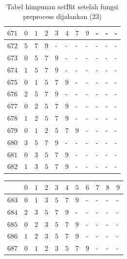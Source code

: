 \begin{appendices}
\begin{table}[H]
\begin{tabular} {|l|l|l|l|l|l|l|l|l|l|l|}
  		$ 671 $ & $ 0 $ &$ 1 $ &$ 2 $ &$ 3 $ &$ 4 $ &$ 7 $ &$ 9 $ & - &  - &  -   \\ \hline
  		$ 672 $ & $ 5 $ &$ 7 $ &$ 9 $ & - &  - &  - &  - &  - &  - &  -   \\ \hline
  		$ 673 $ & $ 0 $ &$ 5 $ &$ 7 $ &$ 9 $ & - &  - &  - &  - &  - &  -   \\ \hline
  		$ 674 $ & $ 1 $ &$ 5 $ &$ 7 $ &$ 9 $ & - &  - &  - &  - &  - &  -   \\ \hline
  		$ 675 $ & $ 0 $ &$ 1 $ &$ 5 $ &$ 7 $ &$ 9 $ & - &  - &  - &  - &  -   \\ \hline
  		$ 676 $ & $ 2 $ &$ 5 $ &$ 7 $ &$ 9 $ & - &  - &  - &  - &  - &  -   \\ \hline
  		$ 677 $ & $ 0 $ &$ 2 $ &$ 5 $ &$ 7 $ &$ 9 $ & - &  - &  - &  - &  -   \\ \hline
  		$ 678 $ & $ 1 $ &$ 2 $ &$ 5 $ &$ 7 $ &$ 9 $ & - &  - &  - &  - &  -   \\ \hline
  		$ 679 $ & $ 0 $ &$ 1 $ &$ 2 $ &$ 5 $ &$ 7 $ &$ 9 $ & - &  - &  - &  -   \\ \hline
  		$ 680 $ & $ 3 $ &$ 5 $ &$ 7 $ &$ 9 $ & - &  - &  - &  - &  - &  -   \\ \hline
  		$ 681 $ & $ 0 $ &$ 3 $ &$ 5 $ &$ 7 $ &$ 9 $ & - &  - &  - &  - &  -   \\ \hline
  		$ 682 $ & $ 1 $ &$ 3 $ &$ 5 $ &$ 7 $ &$ 9 $ & - &  - &  - &  - &  -   \\ \hline
  	\end{tabular}\caption{Tabel himpunan setBit setelah fungsi preprocess dijalankan (23)}
  	\label{tab:setbit_23}
  \end{table}
  \begin{table}[H]
  	\centering
  	\begin{tabular} {|l|l|l|l|l|l|l|l|l|l|l|} \hline
  		\backslashbox{$Num$}{$index$} & $ 0 $ & $ 1 $ & $ 2 $ & $ 3 $ & $ 4 $ & $ 5 $ & $ 6 $ & $ 7 $ & $ 8 $ & $ 9 $ \\ \hline
  		$ 683 $ & $ 0 $ &$ 1 $ &$ 3 $ &$ 5 $ &$ 7 $ &$ 9 $ & - &  - &  - &  -   \\ \hline
  		$ 684 $ & $ 2 $ &$ 3 $ &$ 5 $ &$ 7 $ &$ 9 $ & - &  - &  - &  - &  -   \\ \hline
  		$ 685 $ & $ 0 $ &$ 2 $ &$ 3 $ &$ 5 $ &$ 7 $ &$ 9 $ & - &  - &  - &  -   \\ \hline
  		$ 686 $ & $ 1 $ &$ 2 $ &$ 3 $ &$ 5 $ &$ 7 $ &$ 9 $ & - &  - &  - &  -   \\ \hline
  		$ 687 $ & $ 0 $ &$ 1 $ &$ 2 $ &$ 3 $ &$ 5 $ &$ 7 $ &$ 9 $ & - &  - &  -   \\ \hline

\end{tabular}
\end{table}
\end{appendices}
